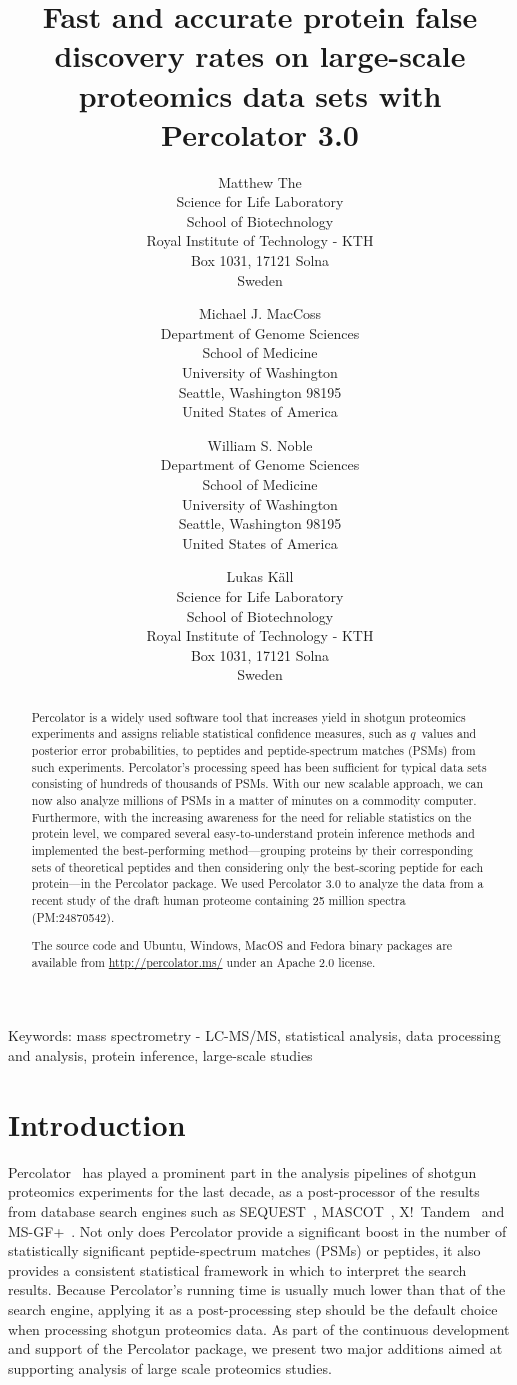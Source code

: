 \documentclass{article}
\title{Fast and accurate protein false discovery rates on large-scale
proteomics data sets with Percolator 3.0}
\author{Matthew The\\
Science for Life Laboratory\\
School of Biotechnology\\
Royal Institute of Technology - KTH\\
Box 1031, 17121 Solna\\ Sweden
\and 
Michael J. MacCoss\\
Department of Genome Sciences\\
School of Medicine\\
University of Washington\\
Seattle, Washington 98195\\
United States of America
\and 
William S. Noble\\
Department of Genome Sciences\\
School of Medicine\\
University of Washington\\
Seattle, Washington 98195\\
United States of America
\and
Lukas K\"{a}ll\\
Science for Life Laboratory\\
School of Biotechnology\\
Royal Institute of Technology - KTH\\ 
Box 1031, 17121 Solna\\ Sweden}
\begin{document}
\maketitle

\doublespacing

Keywords: mass spectrometry - LC-MS/MS, statistical analysis, 
data processing and analysis, protein inference, large-scale studies


\newpage

\begin{abstract} 

Percolator is a widely used software tool that increases yield in
shotgun proteomics experiments and assigns reliable statistical
confidence measures, such as $q$~values and posterior error
probabilities, to peptides and peptide-spectrum matches (PSMs) from
such experiments. Percolator's processing speed has been sufficient
for typical data sets consisting of hundreds of thousands of
PSMs. With our new scalable approach, we can now also analyze millions
of PSMs in a matter of minutes on a commodity computer.  Furthermore,
with the increasing awareness for the need for reliable statistics on
the protein level, we compared several easy-to-understand protein
inference methods and implemented the best-performing
method---grouping proteins by their corresponding sets of theoretical
peptides and then considering only the best-scoring peptide for each
protein---in the Percolator package. We used Percolator 3.0 to analyze
the data from a recent study of the draft human proteome containing 25
million spectra (PM:24870542).

The source code and Ubuntu, Windows, MacOS and Fedora binary packages
are available from \url{http://percolator.ms/}
under an Apache 2.0 license.
\end{abstract}

\newpage

\section*{Introduction}

Percolator~\cite{kall2007} has played a prominent part in the analysis
pipelines of shotgun proteomics experiments for the last decade, as a
post-processor of the results from database search engines such as
SEQUEST~\cite{eng1994}, MASCOT~\cite{cottrell1999},
X!~Tandem~\cite{craig2004tandem} and MS-GF+~\cite{kim2008}. Not only
does Percolator provide a significant boost in the number of
statistically significant peptide-spectrum matches (PSMs) or peptides,
it also provides a consistent statistical framework in which to
interpret the search results. Because Percolator's running time is
usually much lower than that of the search engine, applying it as a
post-processing step should be the default choice when processing
shotgun proteomics data. As part of the continuous development and
support of the Percolator package, we present two major additions
aimed at supporting analysis of large scale proteomics studies.
\end{document}
